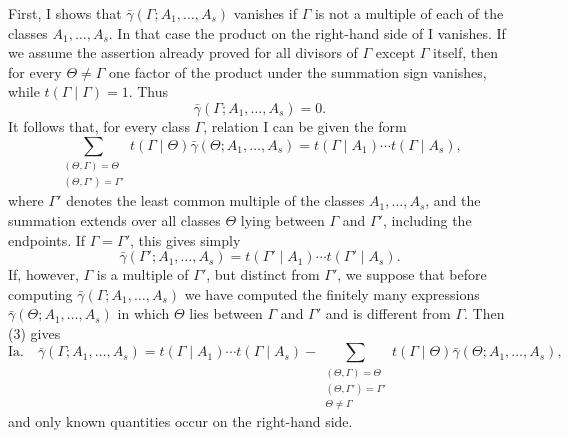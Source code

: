 First, I shows that $\bar\gamma(\Gamma;A_1,\ldots,A_s)$ vanishes if $\Gamma$ is not a multiple of each of the classes $A_1,\ldots,A_s$. In that case the product on the right-hand side of I vanishes. If we assume the assertion already proved for all divisors of $\Gamma$ except $\Gamma$ itself, then for every $\Theta\ne\Gamma$ one factor of the product under the summation sign vanishes, while $t(\Gamma\mid\Gamma)=1$. Thus
\[
 \bar\gamma(\Gamma;A_1,\ldots,A_s)=0.
\]
It follows that, for every class $\Gamma$, relation I can be given the form
\begin{equation}
 \sum_{\substack{(\Theta,\Gamma)=\Theta\\(\Theta,\Gamma')=\Gamma'}}
 t(\Gamma\mid\Theta)\bar\gamma(\Theta;A_1,\ldots,A_s)
 =t(\Gamma\mid A_1)\cdots t(\Gamma\mid A_s),
\tag{3}
\end{equation}
where $\Gamma'$ denotes the least common multiple of the classes $A_1,\ldots,A_s$, and the summation extends over all classes $\Theta$ lying between $\Gamma$ and $\Gamma'$, including the endpoints. If $\Gamma=\Gamma'$, this gives simply
\[
 \bar\gamma(\Gamma';A_1,\ldots,A_s)=t(\Gamma'\mid A_1)\cdots t(\Gamma'\mid A_s).
\]
If, however, $\Gamma$ is a multiple of $\Gamma'$, but distinct from $\Gamma'$, we suppose that before computing $\bar\gamma(\Gamma;A_1,\ldots,A_s)$ we have computed the finitely many expressions $\bar\gamma(\Theta;A_1,\ldots,A_s)$ in which $\Theta$ lies between $\Gamma$ and $\Gamma'$ and is different from $\Gamma$. Then (3) gives
\[
\text{Ia.}\quad
 \bar\gamma(\Gamma;A_1,\ldots,A_s)
 =t(\Gamma\mid A_1)\cdots t(\Gamma\mid A_s)
 -\sum_{\substack{(\Theta,\Gamma)=\Theta\\(\Theta,\Gamma')=\Gamma'\\\Theta\ne\Gamma}}
 t(\Gamma\mid\Theta)\bar\gamma(\Theta;A_1,\ldots,A_s),
\]
and only known quantities occur on the right-hand side.

